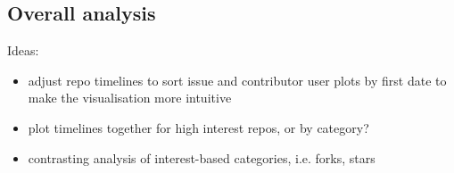 \documentclass[10pt,a4paper]{scrartcl}
\begin{document}
\subsection*{Overall analysis}

Ideas: 
\begin{itemize}
    \item adjust repo timelines to sort issue and contributor user plots by first date to make the visualisation more intuitive
    \item plot timelines together for high interest repos, or by category?
    \item contrasting analysis of interest-based categories, i.e. forks, stars
\end{itemize}

\end{document}
